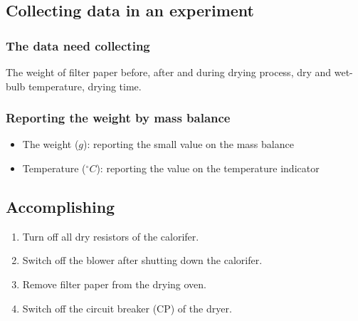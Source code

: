 \subsection{Collecting data in an experiment}
\subsubsection{The data need collecting}
The weight of filter paper before, after and during drying process, dry and wet-bulb temperature, drying time.
\subsubsection{Reporting the weight by mass balance}
\begin{itemize}
    \item The weight ($g$): reporting the small value on the mass balance
    \item Temperature ($^\circ C$): reporting the value on the temperature indicator
\end{itemize}

\subsection{Accomplishing}
\begin{enumerate}
    \item Turn off all dry resistors of the calorifer.
    \item Switch off the blower after shutting down the calorifer.
    \item Remove filter paper from the drying oven.
    \item Switch off the circuit breaker (CP) of the dryer.
\end{enumerate}
